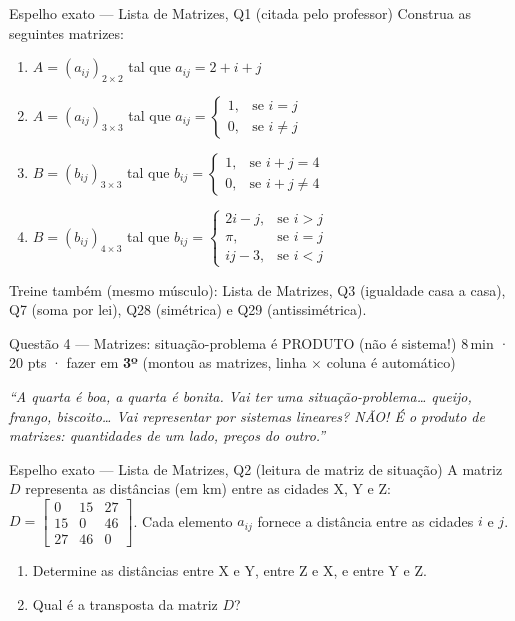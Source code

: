 \documentclass[11pt]{article}
\newcommand{\meta}[1]{{\small\color{inkgray}#1}}
\begin{document}
\begin{espelhobox}{Espelho exato — Lista de Matrizes, Q1 (citada pelo professor)}
Construa as seguintes matrizes:
\begin{enumerate}[label=\alph*), leftmargin=2em]
  \item $A=(a_{ij})_{2\times 2}$ tal que $a_{ij}=2+i+j$
  \item $A=(a_{ij})_{3\times 3}$ tal que $a_{ij}=\begin{cases} 1, & \text{se } i=j \\ 0, & \text{se } i\neq j \end{cases}$
  \item $B=(b_{ij})_{3\times 3}$ tal que $b_{ij}=\begin{cases} 1, & \text{se } i+j=4 \\ 0, & \text{se } i+j\neq 4 \end{cases}$
  \item $B=(b_{ij})_{4\times 3}$ tal que $b_{ij}=\begin{cases} 2i-j, & \text{se } i>j \\ \pi, & \text{se } i=j \\ ij-3, & \text{se } i<j \end{cases}$
\end{enumerate}
\end{espelhobox}

\meta{Treine também (mesmo músculo): Lista de Matrizes, Q3 (igualdade casa a casa), Q7 (soma por lei), Q28 (simétrica) e Q29 (antissimétrica).}

\begin{questaobox}{Questão 4 — Matrizes: situação-problema é PRODUTO (não é sistema!)}
\meta{8\,min · 20 pts · fazer em \textbf{3º} (montou as matrizes, linha $\times$ coluna é automático)}
\end{questaobox}

\begin{profquote}
\small\itshape ``A quarta é boa, a quarta é bonita. Vai ter uma situação-problema\ldots{} queijo, frango, biscoito\ldots{} Vai representar por sistemas lineares? NÃO! É o produto de matrizes: quantidades de um lado, preços do outro.''
\end{profquote}

\begin{espelhobox}{Espelho exato — Lista de Matrizes, Q2 (leitura de matriz de situação)}
A matriz $D$ representa as distâncias (em km) entre as cidades X, Y e Z:
$D=\begin{bmatrix} 0 & 15 & 27 \\ 15 & 0 & 46 \\ 27 & 46 & 0 \end{bmatrix}$.
Cada elemento $a_{ij}$ fornece a distância entre as cidades $i$ e $j$.
\begin{enumerate}[label=\alph*), leftmargin=2em]
  \item Determine as distâncias entre X e Y, entre Z e X, e entre Y e Z.
  \item Qual é a transposta da matriz $D$?
\end{enumerate}
\end{espelhobox}
\end{document}

